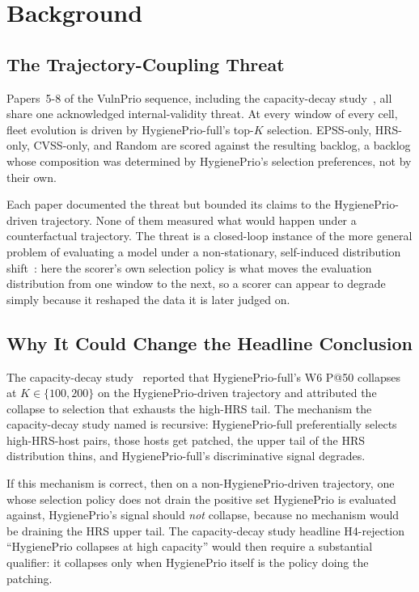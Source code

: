 \section{Background}

\subsection{The Trajectory-Coupling Threat}

Papers~5-8 of the VulnPrio sequence, including the capacity-decay study~\cite{paper6capacity},
all share one acknowledged internal-validity threat. At every window of
every cell, fleet evolution is driven by HygienePrio-full's
top-$K$ selection. EPSS-only, HRS-only, CVSS-only, and Random are scored
against the resulting backlog, a backlog whose composition was
determined by HygienePrio's selection preferences, not by their own.

Each paper documented the threat but bounded its claims to the
HygienePrio-driven trajectory. None of them measured what would happen
under a counterfactual trajectory. The threat is a closed-loop instance
of the more general problem of evaluating a model under a non-stationary,
self-induced distribution shift~\cite{gama2014survey}: here the scorer's
own selection policy is what moves the evaluation distribution from one
window to the next, so a scorer can appear to degrade simply because it
reshaped the data it is later judged on.

\subsection{Why It Could Change the Headline Conclusion}

The capacity-decay study~\cite{paper6capacity} reported that HygienePrio-full's W6 P@50
collapses at $K \in \{100, 200\}$ on the HygienePrio-driven trajectory
and attributed the collapse to selection that exhausts the high-HRS
tail. The
mechanism the capacity-decay study named is recursive: HygienePrio-full preferentially
selects high-HRS-host pairs, those hosts get patched, the upper tail of
the HRS distribution thins, and HygienePrio-full's discriminative
signal degrades.

If this mechanism is correct, then on a non-HygienePrio-driven
trajectory, one whose selection policy does not drain the positive
set HygienePrio is evaluated against, 
HygienePrio's signal should \textit{not} collapse, because no
mechanism would be draining the HRS upper tail. The capacity-decay study headline
H4-rejection ``HygienePrio collapses at high capacity'' would then
require a substantial qualifier: it collapses only when HygienePrio
itself is the policy doing the patching.

